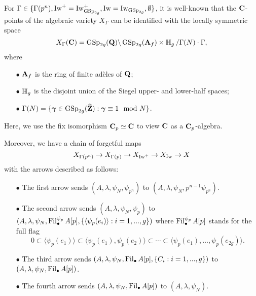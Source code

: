 For $\Gamma \in \{\Gamma(p^n), \operatorname{Iw}^+ = \operatorname{Iw}_{\operatorname{GSp}_{2g}}^+, \operatorname{Iw} = \operatorname{Iw}_{\operatorname{GSp}_{2g}}, \emptyset\}$, it is well-known that the $\operatorname{\mathbf{C}}$-points of the algebraic variety $X_{\Gamma}$ can be identified with the locally symmetric space \[
    X_{\Gamma}(\operatorname{\mathbf{C}}) = \operatorname{GSp}_{2g}(\operatorname{\mathbf{Q}})\backslash \operatorname{GSp}_{2g}(\operatorname{\mathbf{A}}_f)\times \operatorname{\mathbb{H}}_g/\Gamma(N)\cdot\Gamma,
\] where \begin{enumerate}
    \item[$\bullet$] $\operatorname{\mathbf{A}}_f$ is the ring of finite ad\`eles of $\operatorname{\mathbf{Q}}$;
    \item[$\bullet$] $\operatorname{\mathbb{H}}_g$ is the disjoint union of the Siegel upper- and lower-half spaces;
    \item[$\bullet$] $\Gamma(N) = \{\operatorname{\boldsymbol{\gamma}} \in \operatorname{GSp}_{2g}(\widehat{\operatorname{\mathbf{Z}}}): \operatorname{\boldsymbol{\gamma}} \equiv 1 \mod N\}$.
\end{enumerate} Here, we use the fix isomorphism $\operatorname{\mathbf{C}}_p \simeq \operatorname{\mathbf{C}}$ to view $\operatorname{\mathbf{C}}$ as a $\operatorname{\mathbf{C}}_p$-algebra.

Moreover, we have a chain of forgetful maps
$$X_{\Gamma(p^n)}\rightarrow X_{\Gamma(p)}\rightarrow X_{\operatorname{Iw}^+}\rightarrow X_{\operatorname{Iw}}\rightarrow X$$
with the arrows described as follows:
\begin{enumerate}
\item[$\bullet$] The first arrow sends $(A, \lambda, \psi_N, \psi_{p^n})$ to $(A, \lambda, \psi_N, p^{n-1}\psi_{p^n})$.
\item[$\bullet$] The second arrow sends $(A, \lambda, \psi_N, \psi_p)$ to $(A, \lambda, \psi_N, \operatorname{Fil}_{\bullet}^{\psi_p}A[p], \{\langle \psi_p(e_i)\rangle: i=1, ..., g\})$ where $\operatorname{Fil}_{\bullet}^{\psi_p}A[p]$ stands for the full flag $$0\subset \langle \psi_p(e_1)\rangle\subset\langle \psi_p(e_1), \psi_p(e_2)\rangle\subset \cdots\subset \langle\psi_p(e_1), \ldots, \psi_p(e_{2g})\rangle.$$
\item[$\bullet$] The third arrow sends $(A, \lambda, \psi_N, \operatorname{Fil}_{\bullet}A[p], \{C_i: i=1, ..., g\})$ to $(A, \lambda, \psi_N, \operatorname{Fil}_{\bullet}A[p])$.
\item[$\bullet$] The fourth arrow sends $(A, \lambda, \psi_N, \operatorname{Fil}_{\bullet}A[p])$ to $(A, \lambda, \psi_N)$.
\end{enumerate}

